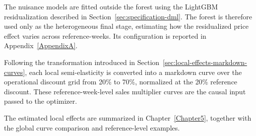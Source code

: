 The nuisance models are fitted outside the forest using the LightGBM residualization described in Section~\ref{sec:specification-dml}. The forest is therefore used only as the heterogeneous final stage, estimating how the residualized price effect varies across reference-weeks. Its configuration is reported in Appendix~\ref{AppendixA}.

Following the transformation introduced in Section~\ref{sec:local-effects-markdown-curves}, each local semi-elasticity is converted into a markdown curve over the operational discount grid from 20\% to 70\%, normalized at the 20\% reference discount. These reference-week-level sales multiplier curves are the causal input passed to the optimizer.

The estimated local effects are summarized in Chapter~\ref{Chapter5}, together with the global curve comparison and reference-level examples.